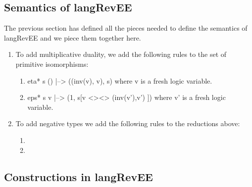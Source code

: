 \documentclass[preprint]{sigplanconf}
\begin{document}
\subsection{Semantics of {{langRevEE}} }

The previous section has defined all the pieces needed to define the
semantics of {{langRevEE}} and we piece them together here. 

\begin{enumerate}
\item 
To add multiplicative duality, we add the following rules to the set
of primitive isomorphisms:

\begin{enumerate}
\item {{eta* s () |--> ((inv(v), v), s)}}
  where {{v}} is a fresh logic variable. 

\item {{eps* s v |--> (1, s[v <><> (inv(v'),v') ])}}
  where {{v'}} is a fresh logic variable. 

\end{enumerate}

\item To add negative types we add the following rules to the
  reductions above: 

  \begin{enumerate}
  \item 


    \item

  \end{enumerate}


\end{enumerate}

\subsection{Constructions in {{langRevEE}} }
\label{sec:monoidal-constructions}
\end{document}
